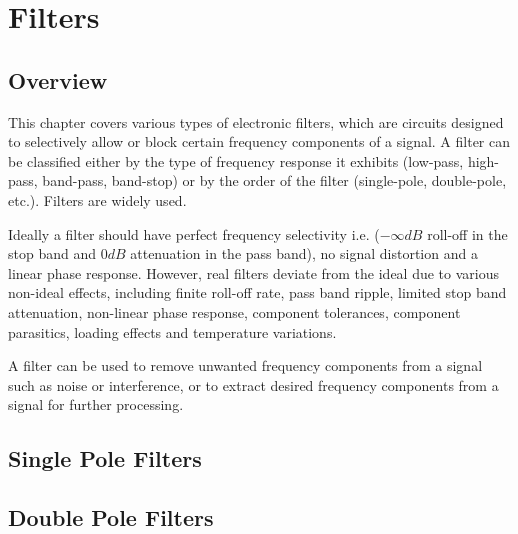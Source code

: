 \chapter{Filters}

\section{Overview}
This chapter covers various types of electronic filters,
which are circuits designed to selectively allow or block
certain frequency components of a signal. A filter can
be classified either by the type of frequency response it
exhibits (low-pass, high-pass, band-pass, band-stop) or
by the order of the filter (single-pole, double-pole, etc.).
Filters are widely used.

Ideally a filter should have perfect frequency selectivity
i.e. (\(-\infty dB\) roll-off in the stop band and \(0 dB\)
attenuation in the pass band), no signal distortion and a
linear phase response. However, real filters deviate from
the ideal due to various non-ideal effects, including finite
roll-off rate, pass band ripple, limited stop band
attenuation, non-linear phase response, component tolerances,
component parasitics, loading effects and temperature
variations.

A filter can be used to remove unwanted frequency components
from a signal such as noise or interference, or to extract
desired frequency components from a signal for further
processing.

\section{Single Pole Filters}


\section{Double Pole Filters}


